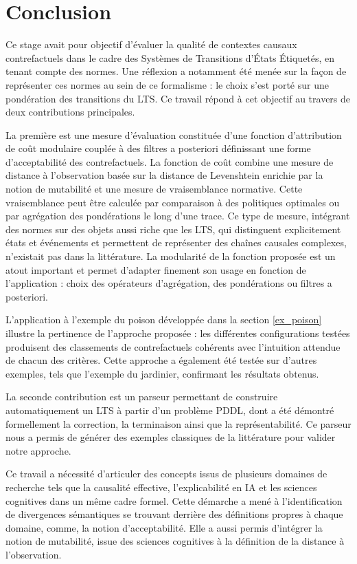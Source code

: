 \newpage
\section{Conclusion}

Ce stage avait pour objectif d'évaluer la qualité de contextes causaux contrefactuels dans le cadre des Systèmes de Transitions d'États Étiquetés, en tenant compte des normes. Une réflexion a notamment été menée sur la façon de représenter ces normes au sein de ce formalisme : le choix s'est porté sur une pondération des transitions du LTS. Ce travail répond à cet objectif au travers de deux contributions principales.

La première est une mesure d'évaluation constituée d'une fonction d'attribution de coût modulaire couplée à des filtres a posteriori définissant une forme d'acceptabilité des contrefactuels. La fonction de coût combine une mesure de distance à l'observation basée sur la distance de Levenshtein enrichie par la notion de mutabilité et une mesure de vraisemblance normative. Cette vraisemblance peut être calculée par comparaison à des politiques optimales ou par agrégation des pondérations le long d'une trace. Ce type de mesure, intégrant des normes sur des objets aussi riche que les LTS, qui distinguent explicitement états et événements et permettent de représenter des chaînes causales complexes, n'existait pas dans la littérature. La modularité de la fonction proposée est un atout important et permet d'adapter finement son usage en fonction de l'application : choix des opérateurs d'agrégation, des pondérations ou filtres a posteriori.

L'application à l'exemple du poison développée dans la section \ref{ex_poison} illustre la pertinence de l'approche proposée : les différentes configurations testées produisent des classements de contrefactuels cohérents avec l'intuition attendue de chacun des critères. Cette approche a également été testée sur d'autres exemples, tels que l'exemple du jardinier, confirmant les résultats obtenus.

La seconde contribution est un parseur permettant de construire automatiquement un LTS à partir d'un problème PDDL, dont a été démontré formellement la correction, la terminaison ainsi que la représentabilité. Ce parseur nous a permis de générer des exemples classiques de la littérature pour valider notre approche.

Ce travail a nécessité d'articuler des concepts issus de plusieurs domaines de recherche tels que la causalité effective, l'explicabilité en IA et les sciences cognitives dans un même cadre formel. Cette démarche a mené à l'identification de divergences sémantiques se trouvant derrière des définitions propres à chaque domaine, comme, la notion d'acceptabilité. Elle a aussi permis d'intégrer la notion de mutabilité, issue des sciences cognitives à la définition de la distance à l'observation. 

